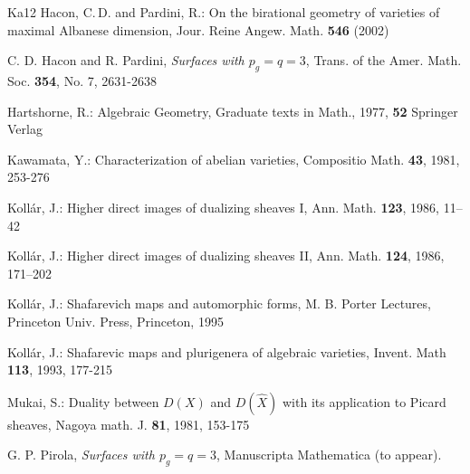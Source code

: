 \documentclass[10pt]{amsart}
\begin{document}
\begin{thebibliography}{Ka12}
{\sc Hacon, C.\,D.} and {\sc Pardini, R.}:
On the birational geometry of varieties of
maximal Albanese dimension, Jour. Reine Angew. Math. {\bf 546} (2002)

 C. D. Hacon and R. Pardini,
{\em Surfaces with $p_g=q=3$},
Trans. of the Amer. Math. Soc. {\bf 354}, No. 7, 2631-2638

{\sc Hartshorne, R.}:
Algebraic Geometry, Graduate texts in Math., 1977, {\bf 52} Springer Verlag


{\sc Kawamata, Y.}:
Characterization of abelian varieties,
Compositio Math. {\bf 43}, 1981, 253-276


{\sc Koll\'ar, J.}:
Higher direct images of dualizing sheaves I,
 Ann. Math. {\bf 123},
1986, 11--42

{\sc Koll\'ar, J.}:
Higher direct images of dualizing sheaves II,
 Ann. Math. {\bf 124},
1986, 171--202

{\sc Koll\'ar, J.}:
Shafarevich maps and automorphic forms,
M. B. Porter Lectures, Princeton Univ. Press, Princeton, 1995

{\sc Koll\'ar, J.}:
Shafarevic maps and plurigenera of algebraic varieties, Invent. Math {\bf 113},
1993, 177-215



{\sc Mukai, S.}:
Duality between $D(X)$ and $D(\hat {X})$
with its application to Picard sheaves,
Nagoya math. J. {\bf 81},
1981, 153-175

G. P. Pirola,
{\em Surfaces with $p_g=q=3$}, Manuscripta Mathematica (to appear).




\end{thebibliography}
\end{document}
